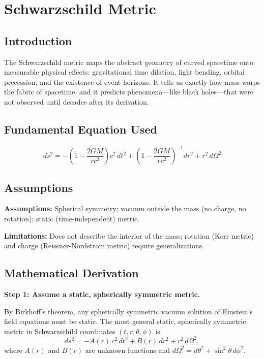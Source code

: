 \chapter{Schwarzschild Metric}

\section*{Introduction}

The Schwarzschild metric maps the abstract geometry of curved spacetime onto measurable physical effects: gravitational time dilation, light bending, orbital precession, and the existence of event horizons. It tells us exactly how mass warps the fabric of spacetime, and it predicts phenomena---like black holes---that were not observed until decades after its derivation.
\section*{Fundamental Equation Used}

\begin{equation}
ds^2 = -\left(1 - \frac{2GM}{rc^2}\right)c^2\,dt^2 + \left(1 - \frac{2GM}{rc^2}\right)^{-1}dr^2 + r^2\,d\Omega^2
\end{equation}
\section*{Assumptions}

\textbf{Assumptions:} Spherical symmetry; vacuum outside the mass (no charge, no rotation); static (time-independent) metric.


\textbf{Limitations:} Does not describe the interior of the mass; rotation (Kerr metric) and charge (Reissner-Nordstrom metric) require generalizations.


\section*{Mathematical Derivation}

\textbf{Step 1: Assume a static, spherically symmetric metric.}

By Birkhoff's theorem, any spherically symmetric vacuum solution of Einstein's field equations must be static. The most general static, spherically symmetric metric in Schwarzschild coordinates $(t, r, \theta, \phi)$ is
\begin{equation}
ds^2 = -A(r)\,c^2\,dt^2 + B(r)\,dr^2 + r^2\,d\Omega^2,
\end{equation}
where $A(r)$ and $B(r)$ are unknown functions and $d\Omega^2 = d\theta^2 + \sin^2\theta\,d\phi^2$.

